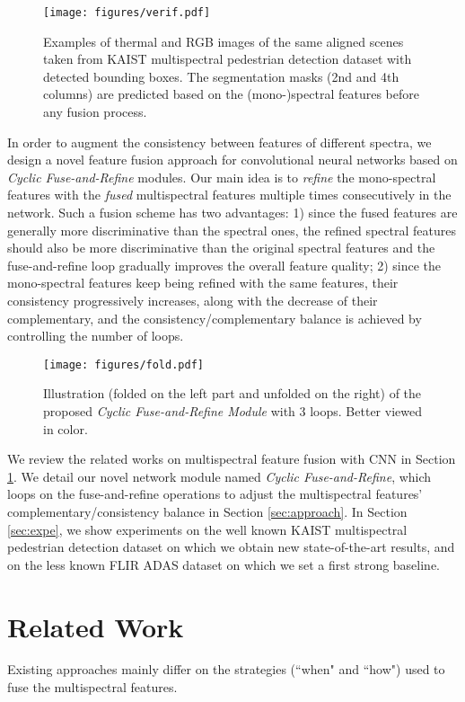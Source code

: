 \documentclass{article}
\begin{document}
\begin{figure}
\centering
\texttt{[image: figures/verif.pdf]}
\caption{Examples of thermal and RGB images of the same aligned scenes taken from KAIST multispectral pedestrian detection dataset \cite{KAIST} with detected bounding boxes. The segmentation masks (2nd and 4th columns) are predicted based on the (mono-)spectral features before any fusion process.}
\label{fig:verif}
\end{figure}

In order to augment the consistency between features of different spectra, we design a novel feature fusion approach for convolutional neural networks based on \textit{Cyclic Fuse-and-Refine} modules. Our main idea is to \emph{refine} the mono-spectral features with the \emph{fused} multispectral features multiple times consecutively in the network. Such a fusion scheme has two advantages:
1) since the fused features are generally more discriminative than the spectral ones, the refined spectral features should also be more discriminative than the original spectral features and the fuse-and-refine loop gradually improves the overall feature quality; 2) since the mono-spectral features keep being refined with the same features, their consistency progressively increases, along with the decrease of their complementary, and the consistency/complementary balance is achieved by controlling the number of loops.

\begin{figure*}[h]
\centering
\texttt{[image: figures/fold.pdf]}
\caption{Illustration (folded on the left part and unfolded on the right) of the proposed \textit{Cyclic Fuse-and-Refine Module} with 3 loops. Better viewed in color.}
\label{fig:fold}
\end{figure*}

We review the related works on multispectral feature fusion with CNN in Section \ref{sec:related}. We detail our novel network module named \textit{Cyclic Fuse-and-Refine}, which loops on the fuse-and-refine operations to adjust the multispectral features' complementary/consistency balance in Section \ref{sec:approach}. In Section \ref{sec:expe}, we show experiments on the well known KAIST multispectral pedestrian detection dataset \cite{KAIST} on which we obtain new state-of-the-art results, and on the less known FLIR ADAS dataset \cite{Flir} on which we set a first strong baseline.
 \section{Related Work}
\label{sec:related}
Existing approaches mainly differ on the strategies (``when" and ``how") used to fuse the multispectral features.
\end{document}
